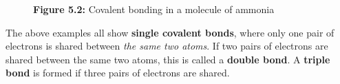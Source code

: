 {\begin{mdframed}[linewidth=4, leftmargin=40, rightmargin=40]
\begin{exercise}
\begin{enumerate}[noitemsep, label=\textbf{Step} \textbf{\arabic*}. ]
\begin{figure}[H]
\begin{center}
      \vspace{2pt}
    \vspace{\rubberspace}\par \begin{cnxcaption}
	  \small \textbf{Figure 5.2: }Covalent bonding in a molecule of ammonia
	\end{cnxcaption}
    \vspace{.1in}
    \end{center}
 \end{figure}       
        \end{enumerate}
    \end{exercise}
    \end{mdframed}
    }
    \noindent
        \label{m38704*id139334}The above examples all show \textbf{single covalent bonds}, where only one pair of electrons is shared between \textsl{the same two atoms}. If two pairs of electrons are shared between the same two atoms, this is called a \textbf{double bond}. A \textbf{triple bond} is formed if three pairs of electrons are shared.\par \pagebreak
\label{m38704*secfhsst!!!underscore!!!id142}\vspace{.5cm} 
      \noindent
